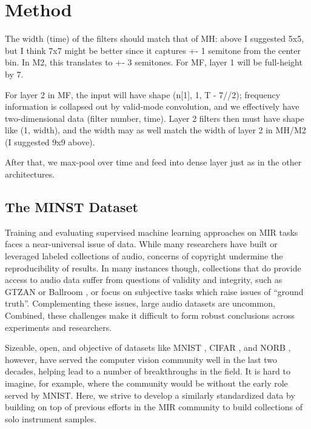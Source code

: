 \documentclass{article}
\begin{document}






\section{Method}\label{sec:typeset_text}

The width (time) of the filters should match that of MH: above I suggested 5x5, but I think 7x7 might be better since it captures +- 1 semitone from the center bin. In M2, this translates to +- 3 semitones. For MF, layer 1 will be full-height by 7.

For layer 2 in MF, the input will have shape (n[1], 1, T - 7//2); frequency information is collapsed out by valid-mode convolution, and we effectively have two-dimensional data (filter number, time). Layer 2 filters then must have shape like (1, width), and the width may as well match the width of layer 2 in MH/M2 (I suggested 9x9 above).

After that, we max-pool over time and feed into dense layer just as in the other architectures.




\subsection{The MINST Dataset}\label{subsec:body}

Training and evaluating supervised machine learning approaches on MIR tasks faces a near-universal issue of data.
While many researchers have built or leveraged labeled collections of audio, concerns of copyright undermine the reproducibility of results.
In many instances though, collections that do provide access to audio data suffer from questions of validity and integrity, such as GTZAN \cite{Sturm} or Ballroom \cite{Sturm}, or focus on subjective tasks which raise issues of ``ground truth''.
Complementing these issues, large audio datasets are uncommon,
Combined, these challenges make it difficult to form robust conclusions across experiments and researchers.

Sizeable, open, and objective of datasets like MNIST \cite{}, CIFAR \cite{}, and NORB \cite{}, however, have served the computer vision community well in the last two decades, helping lead to a number of breakthroughs in the field.
It is hard to imagine, for example, where the community would be without the early role served by MNIST.
Here, we strive to develop a similarly standardized data by building on top of previous efforts in the MIR community to build collections of solo instrument samples.
\end{document}
